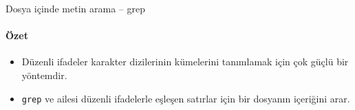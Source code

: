 \begin{section}{Dosya içinde metin arama – grep}
\paragraph{Özet}{
\begin{itemize}
 \item Düzenli ifadeler karakter dizilerinin kümelerini tanımlamak için çok güçlü bir yöntemdir.
 \item \verb|grep| ve ailesi düzenli ifadelerle eşleşen satırlar için bir dosyanın içeriğini arar.
\end{itemize}}

\end{section}
